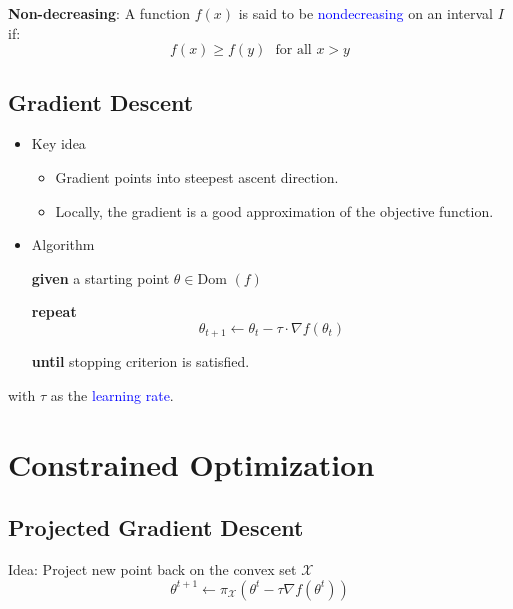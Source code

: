 \documentclass[a4paper,10pt,twoside=true,DIV=10,headsepline,plainheadsepline]{scrartcl}
\begin{document}
			\textbf{Non-decreasing}: A function $f(x)$ is said to be \textcolor{blue}{nondecreasing} on an interval $I$ if:
			\begin{equation}
				f (x) \geq f(y) \textrm{ } \textrm{for all } x > y 
			\end{equation}
			

		
		\subsection{Gradient Descent}
		\begin{itemize}
 			\item Key idea
			\begin{itemize}
 				\item Gradient points into steepest ascent direction.
				\item Locally, the gradient is a good approximation of the objective function.
			\end{itemize}
			\item Algorithm

			\textbf{given} a starting point $\theta \in \textrm{Dom }(f)$

			\textbf{repeat}
				\begin{equation} 
					\theta_{t+1} \leftarrow \theta_{t} - \tau \cdot \nabla f(\theta_{t})
				\end{equation}

			\textbf{until} stopping criterion is satisfied.

		\end{itemize}

		
		
		with $\tau$ as the \textcolor{blue}{learning rate}.
		
		
		
	\section{Constrained Optimization}
		\subsection{Projected Gradient Descent}

			Idea: Project new point back on the convex set $\mathcal{X}$
				\begin{equation} 
					\theta^{t+1} \leftarrow \pi_{\mathcal{X}} (\theta^t - \tau \nabla f(\theta^t))
				\end{equation}
\end{document}
